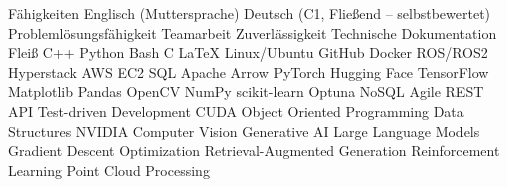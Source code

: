 
\begin{rubric}{Fähigkeiten}
\entry*[Sprachen]
	\skilldotfirst Englisch (Muttersprache) \skilldot Deutsch (C1, Fließend -- selbstbewertet)
\entry*[Stärken] 
	\skilldotfirst Problemlösungsfähigkeit \skilldot Teamarbeit \skilldot Zuverlässigkeit \newline \skilldotfirst Technische Dokumentation \skilldot Fleiß %
\entry*[Coding]
	\skilldotfirst C++ \skilldot Python \skilldot Bash \skilldot C \skilldot LaTeX 
\entry*[Software] 
	\skilldotfirst Linux/Ubuntu \skilldot GitHub \skilldot Docker \skilldot ROS/ROS2 \newline \skilldotfirst Hyperstack \skilldot AWS EC2 \skilldot SQL \skilldot Apache Arrow
\entry*[Libraries (Py)]  
	\skilldotfirst PyTorch \skilldot Hugging Face \skilldot TensorFlow \skilldot Matplotlib \skilldot Pandas \newline \skilldot OpenCV \skilldot NumPy \skilldot scikit-learn \skilldot Optuna \skilldot NoSQL
\entry*[Wissen] 	
	\skilldotfirst Agile \skilldot REST API \skilldot Test-driven Development \skilldot CUDA  \newline \skilldotfirst Object Oriented Programming \skilldot Data Structures \skilldot NVIDIA
	\skilldotfirst Computer Vision \skilldot Generative AI \skilldot Large Language Models \newline \skilldotfirst Gradient Descent Optimization \skilldot Retrieval-Augmented Generation \newline \skilldotfirst Reinforcement Learning  \skilldot Point Cloud Processing

\end{rubric}
